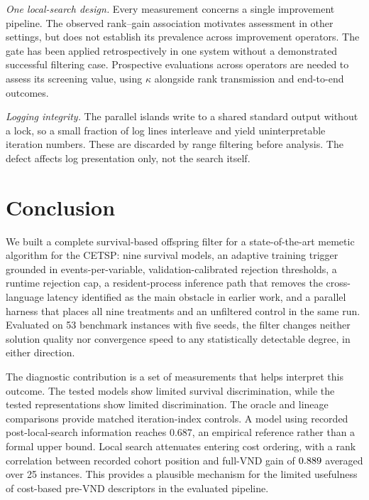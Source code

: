 \documentclass[a4paper,fleqn]{cas-dc}
\begin{document}
\emph{One local-search design.} Every measurement concerns a single improvement
pipeline. The observed rank--gain association motivates assessment in other
settings, but does not establish its prevalence across improvement operators.
The gate has been applied retrospectively in one system without a demonstrated
successful filtering case. Prospective evaluations across operators are needed
to assess its screening value, using $\kappa$ alongside rank transmission and
end-to-end outcomes.

\emph{Logging integrity.} The parallel islands write to a shared standard output
without a lock, so a small fraction of log lines interleave and yield
uninterpretable iteration numbers. These are discarded by range filtering before
analysis. The defect affects log presentation only, not the search itself.

\section{Conclusion}\label{sec:conclusion}

We built a complete survival-based offspring filter for a state-of-the-art
memetic algorithm for the CETSP: nine survival models, an adaptive training
trigger grounded in events-per-variable, validation-calibrated rejection
thresholds, a runtime rejection cap, a resident-process inference path that
removes the cross-language latency identified as the main obstacle in earlier
work, and a parallel harness that places all nine treatments and an unfiltered
control in the same run. Evaluated on 53 benchmark instances with five seeds, the
filter changes neither solution quality nor convergence speed to any
statistically detectable degree, in either direction.

The diagnostic contribution is a set of measurements that helps interpret this
outcome. The tested models show limited survival discrimination, while the
tested representations show limited discrimination. The oracle and lineage
comparisons provide matched iteration-index controls. A model using recorded post-local-search information
reaches $0.687$, an empirical reference rather than a formal upper bound.
Local search attenuates entering cost ordering, with a rank correlation between
recorded cohort position and full-VND gain of $0.889$ averaged over
25 instances. This provides a plausible mechanism for the limited usefulness
of cost-based pre-VND descriptors in the evaluated pipeline.
\end{document}
